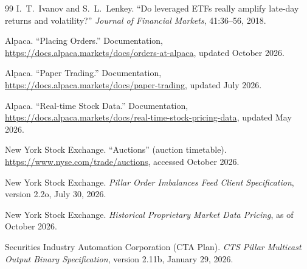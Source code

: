 \documentclass[10pt, a4paper, twocolumn]{article}
\begin{document}
\begin{thebibliography}{99}
I.~T.\ Ivanov and S.~L.\ Lenkey.
\newblock ``Do leveraged ETFs really amplify late-day returns and volatility?''
\newblock \textit{Journal of Financial Markets}, 41:36--56, 2018.

Alpaca.
\newblock ``Placing Orders.''
\newblock Documentation, \url{https://docs.alpaca.markets/docs/orders-at-alpaca}, updated October 2026.

Alpaca.
\newblock ``Paper Trading.''
\newblock Documentation, \url{https://docs.alpaca.markets/docs/paper-trading}, updated July 2026.

Alpaca.
\newblock ``Real-time Stock Data.''
\newblock Documentation, \url{https://docs.alpaca.markets/docs/real-time-stock-pricing-data}, updated May 2026.

New York Stock Exchange.
\newblock ``Auctions'' (auction timetable).
\newblock \url{https://www.nyse.com/trade/auctions}, accessed October 2026.

New York Stock Exchange.
\newblock \textit{Pillar Order Imbalances Feed Client Specification}, version 2.2o, July 30, 2026.

New York Stock Exchange.
\newblock \textit{Historical Proprietary Market Data Pricing}, as of October 2026.

Securities Industry Automation Corporation (CTA Plan).
\newblock \textit{CTS Pillar Multicast Output Binary Specification}, version 2.11b, January 29, 2026.

\end{thebibliography}
\end{document}
